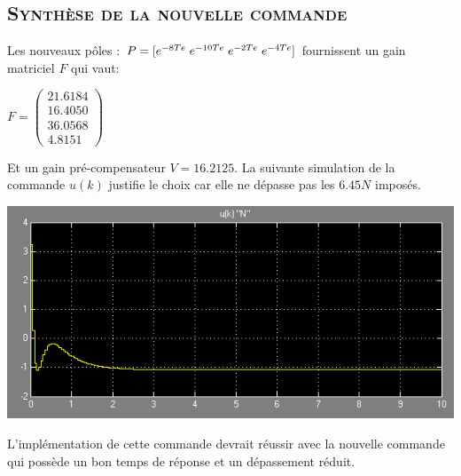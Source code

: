\subsection{\textsc{ Synthèse de la nouvelle commande }}

Les nouveaux pôles : $ P = [e^{-8Te} \hspace{1 mm}  e^{-10Te} \hspace{1 mm} e^{-2Te} \hspace{1 mm} e^{-4Te}]$ fournissent un gain matriciel $F$ qui vaut:

\begin{center}

$F = \begin{pmatrix}
	   21.6184 \\  16.4050  \\ 36.0568 \\   4.8151
\end{pmatrix}$\\
\end{center}

Et un gain pré-compensateur $V=16.2125$. La suivante simulation de la commande $u(k)$ justifie le choix car elle ne dépasse pas les $6.45N$ imposés. 

	\begin{center}
	\includegraphics[scale=0.6]{newton2.png}
	\label{fig6} 
	\end{center}
	
L'implémentation de cette commande devrait réussir avec la nouvelle commande qui possède un bon temps de réponse et un dépassement réduit. 
	
